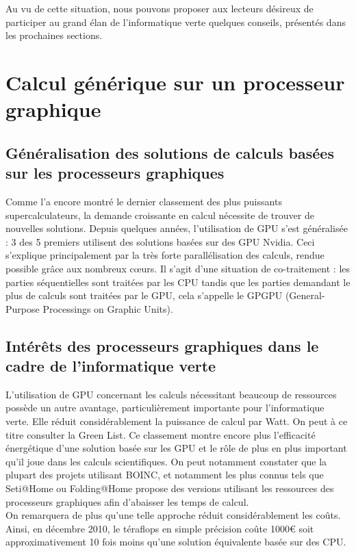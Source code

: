 \documentclass[a4paper,11pt,french]{report}
\begin{document}
Au vu de cette situation, nous pouvons proposer aux lecteurs désireux de participer au grand élan de l'informatique verte quelques conseils, présentés dans les prochaines sections.

\section{Calcul générique sur un processeur graphique}
\subsection{Généralisation des solutions de calculs basées sur les processeurs graphiques}
Comme l’a encore montré le dernier classement\cite{classement} des plus puissants supercalculateurs, la demande croissante en calcul nécessite de trouver de nouvelles solutions. Depuis quelques années, l’utilisation de GPU\cite{GPU2} s’est généralisée : 3 des 5 premiers utilisent des solutions basées sur des GPU Nvidia. Ceci s’explique principalement par la très forte parallélisation des calculs, rendue possible grâce aux nombreux cœurs. Il s’agit d’une situation de co-traitement : les parties séquentielles sont traitées par les CPU tandis que les parties demandant le plus de calculs sont traitées par le GPU, cela s’appelle le GPGPU\cite{GPGPU} (General-Purpose Processings on Graphic Units).\\

\subsection{Intérêts des processeurs graphiques dans le cadre de l'informatique verte}
L'utilisation de GPU concernant les calculs nécessitant beaucoup de ressources possède un autre avantage, particulièrement importante pour l'informatique verte. Elle réduit considérablement la puissance de calcul par Watt. On peut à ce titre consulter la Green List\cite{green500}. Ce classement montre encore plus l’efficacité énergétique d’une solution basée sur les GPU et le rôle de plus en plus important qu'il joue dans les calculs scientifiques. On peut notamment constater que la plupart des projets utilisant BOINC, et notamment les plus connus tels que Seti@Home ou Folding@Home propose des versions utilisant les ressources des processeurs graphiques afin d'abaisser les temps de calcul.\\

On remarquera de plus qu’une telle approche réduit considérablement les coûts. Ainsi, en décembre 2010, le téraflops\cite{Flops} en simple précision coûte 1000\euro{}  soit approximativement 10 fois moins qu’une solution équivalente basée sur des CPU.\\
\end{document}
